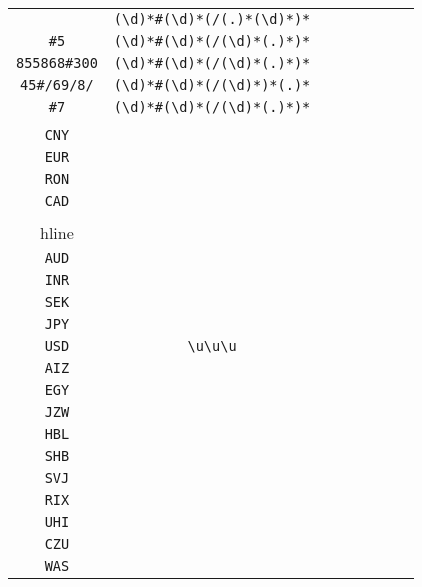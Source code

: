 \begin{longtable}{cccccccc}
\begin{tabular}{ll}
    \verb|4#/4f9~w| & \verb|(\d)*#(\d)*(/(.)*(\d)*)*|\\
\verb|#5| & \verb|(\d)*#(\d)*(/(\d)*(.)*)*|\\
\verb|855868#300| & \verb|(\d)*#(\d)*(/(\d)*(.)*)*|\\
\verb|45#/69/8/| & \verb|(\d)*#(\d)*(/(\d)*)*(.)*|\\
\verb|#7| & \verb|(\d)*#(\d)*(/(\d)*(.)*)*|
\end{tabular}
\\\midrule 
\begin{tabular}{l}
    \verb|GBP|\\
\verb|CNY|\\
\verb|EUR|\\
\verb|RON|\\
\verb|CAD|\\
\\hline\\
\verb|AUD|\\
\verb|INR|\\
\verb|SEK|\\
\verb|JPY|\\
\verb|USD|
\end{tabular}

&
\verb|\u\u\u|
&

\begin{tabular}{l}
    \verb|\u\u\u|\\
\verb|AIZ|\\
\verb|EGY|\\
\verb|JZW|\\
\verb|HBL|\\
\verb|SHB|
\end{tabular}

&

\begin{tabular}{l}
    \verb|\u\u\u|\\
\verb|SVJ|\\
\verb|RIX|\\
\verb|UHI|\\
\verb|CZU|\\
\verb|WAS|
\end{tabular}

&


\end{longtable}
